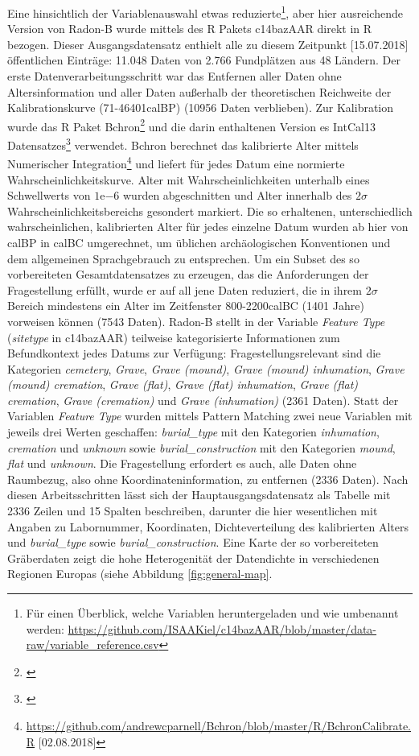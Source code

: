 \documentclass[openany,twoside,twocolumn]{book}
\let\rmarkdownfootnote\footnote%
\def\footnote{\protect\rmarkdownfootnote}
\begin{document}
Eine hinsichtlich der Variablenauswahl etwas reduzierte\footnote{Für
  einen Überblick, welche Variablen heruntergeladen und wie umbenannt
  werden:
  \url{https://github.com/ISAAKiel/c14bazAAR/blob/master/data-raw/variable_reference.csv}},
aber hier ausreichende Version von Radon-B wurde mittels des R Pakets
c14bazAAR direkt in R bezogen. Dieser Ausgangsdatensatz enthielt alle zu
diesem Zeitpunkt {[}15.07.2018{]} öffentlichen Einträge: 11.048 Daten
von 2.766 Fundplätzen aus 48 Ländern. Der erste
Datenverarbeitungsschritt war das Entfernen aller Daten ohne
Altersinformation und aller Daten außerhalb der theoretischen Reichweite
der Kalibrationskurve (71-46401calBP) (10956 Daten verblieben). Zur
Kalibration wurde das R Paket Bchron\footnote{\textcite{haslett_simple_2008}}
und die darin enthaltenen Version es IntCal13 Datensatzes\footnote{\textcite{reimer_intcal13_2013}}
verwendet. Bchron berechnet das kalibrierte Alter mittels Numerischer
Integration\footnote{\url{https://github.com/andrewcparnell/Bchron/blob/master/R/BchronCalibrate.R}
  {[}02.08.2018{]}} und liefert für jedes Datum eine normierte
Wahrscheinlichkeitskurve. Alter mit Wahrscheinlichkeiten unterhalb eines
Schwellwerts von \(1\mathrm{e}{-6}\) wurden abgeschnitten und Alter
innerhalb des \(2\sigma\) Wahrscheinlichkeitsbereichs gesondert
markiert. Die so erhaltenen, unterschiedlich wahrscheinlichen,
kalibrierten Alter für jedes einzelne Datum wurden ab hier von calBP in
calBC umgerechnet, um üblichen archäologischen Konventionen und dem
allgemeinen Sprachgebrauch zu entsprechen. Um ein Subset des so
vorbereiteten Gesamtdatensatzes zu erzeugen, das die Anforderungen der
Fragestellung erfüllt, wurde er auf all jene Daten reduziert, die in
ihrem \(2\sigma\) Bereich mindestens ein Alter im Zeitfenster
800-2200calBC (1401 Jahre) vorweisen können (7543 Daten). Radon-B stellt
in der Variable \emph{Feature Type} (\emph{sitetype} in c14bazAAR)
teilweise kategorisierte Informationen zum Befundkontext jedes Datums
zur Verfügung: Fragestellungsrelevant sind die Kategorien
\emph{cemetery}, \emph{Grave}, \emph{Grave (mound)}, \emph{Grave (mound)
inhumation}, \emph{Grave (mound) cremation}, \emph{Grave (flat)},
\emph{Grave (flat) inhumation}, \emph{Grave (flat) cremation},
\emph{Grave (cremation)} und \emph{Grave (inhumation)} (2361 Daten).
Statt der Variablen \emph{Feature Type} wurden mittels Pattern Matching
zwei neue Variablen mit jeweils drei Werten geschaffen:
\emph{burial\_type} mit den Kategorien \emph{inhumation},
\emph{cremation} und \emph{unknown} sowie \emph{burial\_construction}
mit den Kategorien \emph{mound}, \emph{flat} und \emph{unknown}. Die
Fragestellung erfordert es auch, alle Daten ohne Raumbezug, also ohne
Koordinateninformation, zu entfernen (2336 Daten). Nach diesen
Arbeitsschritten lässt sich der Hauptausgangsdatensatz als Tabelle mit
2336 Zeilen und 15 Spalten beschreiben, darunter die hier wesentlichen
mit Angaben zu Labornummer, Koordinaten, Dichteverteilung des
kalibrierten Alters und \emph{burial\_type} sowie
\emph{burial\_construction}. Eine Karte der so vorbereiteten Gräberdaten
zeigt die hohe Heterogenität der Datendichte in verschiedenen Regionen
Europas (siehe Abbildung \ref{fig:general-map}.
\end{document}

